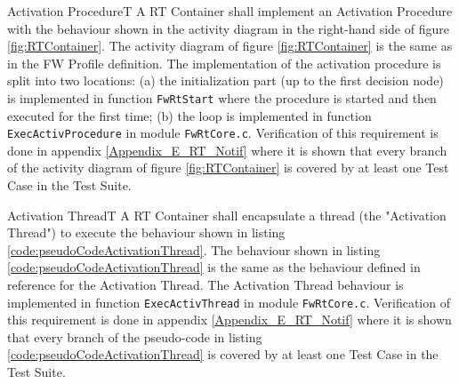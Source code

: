 \documentclass[requirements]{../fwprofile}
\begin{document}
\begin{fw_req}{Activation Procedure}{T}
{A RT Container shall implement an Activation Procedure with the behaviour shown in the activity diagram in the right-hand side of figure \ref{fig:RTContainer}.}
{The activity diagram of figure \ref{fig:RTContainer} is the same as in the FW Profile definition.}
{The implementation of the activation procedure is split into two locations: (a) the initialization part (up to the first decision node) is implemented in function \texttt{FwRtStart} where the procedure is started and then executed for the first time; (b) the loop is implemented in function \texttt{ExecActivProcedure} in module \texttt{FwRtCore.c}.} 
{Verification of this requirement is done in appendix \ref{Appendix_E_RT_Notif} where it is shown that every branch of the activity diagram of figure \ref{fig:RTContainer} is covered by at least one Test Case in the Test Suite.}
\end{fw_req}


\begin{fw_req}{Activation Thread}{T}
{A RT Container shall encapsulate a thread (the "Activation Thread") to execute the behaviour shown in listing \ref{code:pseudoCodeActivationThread}.}
{The behaviour shown in listing \ref{code:pseudoCodeActivationThread} is the same as the behaviour defined in reference \cite{ref:fwprofile} for the Activation Thread. }
{The Activation Thread behaviour is implemented in function \texttt{ExecActivThread} in module \texttt{FwRtCore.c}.} 
{Verification of this requirement is done in appendix \ref{Appendix_E_RT_Notif} where it is shown that every branch of the pseudo-code in listing \ref{code:pseudoCodeActivationThread} is covered by at least one Test Case in the Test Suite.}
\end{fw_req}
\end{document}
